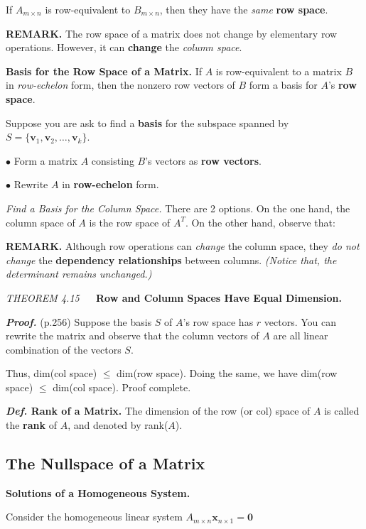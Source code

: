 \documentclass{article}
\newcommand\B{\textbf}
\newcommand\tcl{\begin{tcolorbox}[colback = {blue9}]}
\newcommand\etcl{\end{tcolorbox}}
\newcommand\x{\times}
\begin{document}
\begin{tcolorbox}
    If $A_{m\x n}$ is row-equivalent to $B_{m \x n}$, then they have the \textit{same} \B{row  space}.
    \etcl

    \B{REMARK. } The row space of a matrix does not change by elementary row operations. However, it can
    \textbf{change} the \textit{column space}.

    \tcl
    \B{Basis for the Row Space of a Matrix. } If $A$ is row-equivalent to a matrix $B$ in \textit{row-echelon} form, then the
    nonzero row vectors of $B$ form a basis for $A$'s \B{row space}.
    \etcl 

    Suppose you are ask to find a \B{basis} for the subspace spanned by $S = \{\B{v}_1, \B{v}_2, \dots, \B{v}_k\}$.

    \quad $\bullet$ Form a matrix $A$ consisting $B$'s vectors as \B{row vectors}. 

    \quad $\bullet$ Rewrite $A$ in \B{row-echelon} form.

    \textit{Find a Basis for the Column Space. } There are 2 options. On the one hand, the column space of $A$ is
    the row space of $A^T$. On the other hand, observe that:
    
    \B{REMARK.} Although row operations can \textit{change} the column
    space, they \textit{do not change} the \B{dependency relationships} between columns. \textit{(Notice that, the determinant 
    remains unchanged.)}

    \tcl
    \textit{THEOREM 4.15} $\quad$ \textbf{Row and Column Spaces Have Equal Dimension.}
    \etcl 
    \B{\textit{Proof.}} (p.256) Suppose the basis $S$ of $A$'s row space has $r$ vectors. You can rewrite the matrix and observe
    that the column vectors of $A$ are all linear combination of the vectors $S$. 

    Thus, dim(col space) $\le$ dim(row space). Doing the same, we have dim(row space) $\le$ dim(col space). Proof
    complete.

    \tcl
        \B{\textit{Def.} Rank of a Matrix. }
        The dimension of the row (or col) space of $A$ is called the \B{rank} of $A$, and denoted by rank($A$).
    \etcl 

    \subsection{The Nullspace of a Matrix}
    
    \tcl 
    \B{Solutions of a Homogeneous System. }

    Consider the homogeneous linear system $A_{m\x n}\B{x}_{n \x 1} = \B{0}$
    

\end{tcolorbox}
\end{document}
